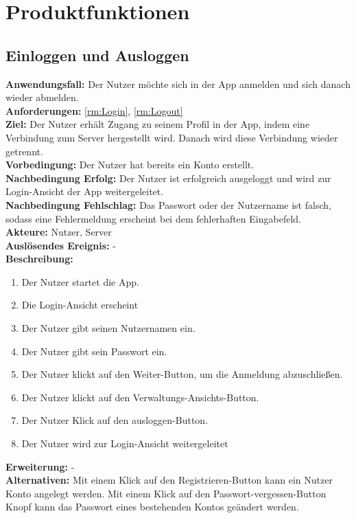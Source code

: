 \documentclass[parskip=full]{scrartcl}
\newcommand{\changelocaltocdepth}[1]{%
  \addtocontents{toc}{\protect\setcounter{tocdepth}{#1}}%
  \setcounter{tocdepth}{#1}%
}
\begin{document}
\section{Produktfunktionen}

\changelocaltocdepth{1}
\renewcommand{\thesubsection}{$\langle$F\arabic{subsection}0$\rangle$}

\subsection{Einloggen und Ausloggen}
\textbf{Anwendungsfall:} Der Nutzer möchte sich in der App anmelden und sich danach wieder abmelden.\\
\textbf{Anforderungen:} \ref{rm:Login}, \ref{rm:Logout}\\
\textbf{Ziel:} Der Nutzer erhält Zugang zu seinem Profil in der App, indem eine Verbindung zum Server hergestellt wird. Danach wird diese Verbindung wieder getrennt.\\
\textbf{Vorbedingung:} Der Nutzer hat bereits ein Konto erstellt.\\
\textbf{Nachbedingung Erfolg:} Der Nutzer ist erfolgreich ausgeloggt und wird zur Login-Ansicht der App weitergeleitet.\\
\textbf{Nachbedingung Fehlschlag:} Das Passwort oder der Nutzername ist falsch, sodass eine Fehlermeldung erscheint bei dem fehlerhaften Eingabefeld.\\
\textbf{Akteure:} Nutzer, Server\\
\textbf{Auslösendes Ereignis:} -\\
\textbf{Beschreibung:}
\begin{enumerate}
    \item Der Nutzer startet die App.
    \item Die Login-Ansicht erscheint
    \item Der Nutzer gibt seinen Nutzernamen ein.
    \item Der Nutzer gibt sein Passwort ein.
    \item Der Nutzer klickt auf den Weiter-Button, um die Anmeldung abzuschließen.
    \item Der Nutzer klickt auf den Verwaltungs-Ansichts-Button.
    \item Der Nutzer Klick auf den ausloggen-Button.
    \item Der Nutzer wird zur Login-Ansicht weitergeleitet
\end{enumerate}
\textbf{Erweiterung:} -\\
\textbf{Alternativen:} Mit einem Klick auf den Registrieren-Button kann ein Nutzer Konto angelegt werden. Mit einem Klick auf den Passwort-vergessen-Button Knopf kann das Passwort eines bestehenden Kontos geändert werden.
\newpage
\end{document}
